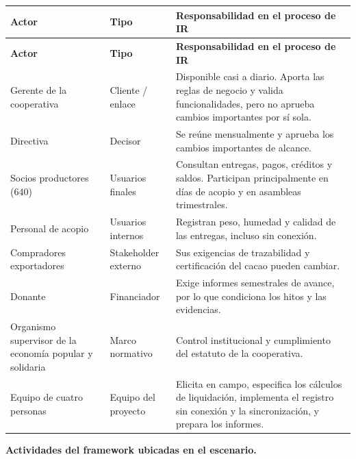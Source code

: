 {\small
\setlength{\tabcolsep}{4pt}
\renewcommand{\arraystretch}{1.3}
\begin{longtable}{
|>{\raggedright\arraybackslash}p{}
|>{\raggedright\arraybackslash}p{}
|>{\raggedright\arraybackslash}p{}|}
\hline
\textbf{Actor} & \textbf{Tipo} & \textbf{Responsabilidad en el proceso de IR} \\
\hline
\endfirsthead
\hline
\textbf{Actor} & \textbf{Tipo} & \textbf{Responsabilidad en el proceso de IR} \\
\hline
\endhead
Gerente de la cooperativa & Cliente / enlace & Disponible casi a diario. Aporta las reglas de negocio y valida funcionalidades, pero no aprueba cambios importantes por sí sola. \\
\hline
Directiva & Decisor & Se reúne mensualmente y aprueba los cambios importantes de alcance. \\
\hline
Socios productores (640) & Usuarios finales & Consultan entregas, pagos, créditos y saldos. Participan principalmente en días de acopio y en asambleas trimestrales. \\
\hline
Personal de acopio & Usuarios internos & Registran peso, humedad y calidad de las entregas, incluso sin conexión. \\
\hline
Compradores exportadores & Stakeholder externo & Sus exigencias de trazabilidad y certificación del cacao pueden cambiar. \\
\hline
Donante & Financiador & Exige informes semestrales de avance, por lo que condiciona los hitos y las evidencias. \\
\hline
Organismo supervisor de la economía popular y solidaria & Marco normativo & Control institucional y cumplimiento del estatuto de la cooperativa. \\
\hline
Equipo de cuatro personas & Equipo del proyecto & Elicita en campo, especifica los cálculos de liquidación, implementa el registro sin conexión y la sincronización, y prepara los informes. \\
\hline
\end{longtable}
}

\textbf{Actividades del framework ubicadas en el escenario.}

